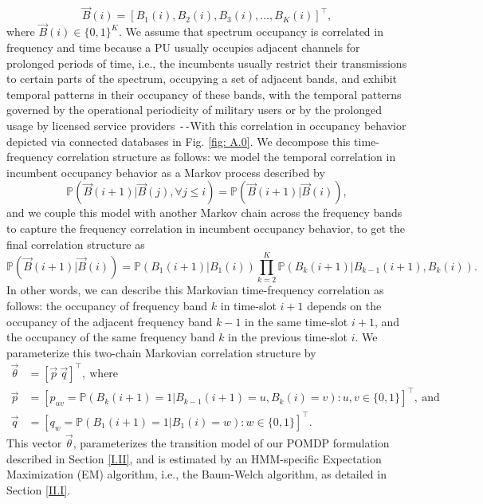 \documentclass[12pt, draftcls, onecolumn]{IEEEtran}
\begin{document}
\begin{equation}\label{4}
    \vec{B}(i)=[B_{1}(i),B_{2}(i),B_{3}(i),\dots,B_{K}(i)]^{\intercal},
\end{equation}
where $\vec{B}(i){\in}\{0,1\}^{K}$.
We assume that spectrum occupancy is correlated in frequency and time because a PU usually occupies adjacent channels for prolonged periods of time, i.e., the incumbents usually restrict their transmissions to certain parts of the spectrum, occupying a set of adjacent bands, and exhibit temporal patterns in their occupancy of these bands, with the temporal patterns governed by the operational periodicity of military users or by the prolonged usage by licensed service providers \cite{WCL:12}\texttt{-{}-}With this correlation in occupancy behavior depicted via connected databases in Fig. \ref{fig: A.0}. We decompose this time-frequency correlation structure as follows: we model the temporal correlation in incumbent occupancy behavior as a Markov process described by
\begin{equation}\label{5}
    \mathbb{P}(\vec{B}(i+1)|\vec{B}(j),\forall j \leq i)=\mathbb{P}(\vec{B}(i+1)|\vec{B}(i)),
\end{equation}
and we couple this model with another Markov chain across the frequency bands to capture the frequency correlation in incumbent occupancy behavior, to get the final correlation structure as
\begin{equation}\label{6}
    \mathbb{P}(\vec{B}(i+1)|\vec{B}(i))=\mathbb{P}(B_{1}(i+1)|B_{1}(i))\prod_{k=2}^{K}\mathbb{P}(B_{k}(i+1)|B_{k-1}(i+1),B_{k}(i)).
\end{equation}
In other words, we can describe this Markovian time-frequency correlation as follows: the occupancy of frequency band $k$ in time-slot $i+1$ depends on the occupancy of the adjacent frequency band $k-1$ in the same time-slot $i+1$, and the occupancy of the same frequency band $k$ in the previous time-slot $i$. We parameterize this two-chain Markovian correlation structure by
\begin{equation}\label{7}
    \begin{aligned}
        \vec{\theta}&=[\vec{p}\ \vec{q}]^{\intercal},\ \text{where}\\
        \vec{p}&=[p_{uv}=\mathbb{P}(B_{k}(i+1)=1|B_{k-1}(i+1)=u,B_{k}(i)=v):u,v \in \{0,1\}]^{\intercal},\ \text{and}\\
        \vec{q}&=[q_{w}=\mathbb{P}(B_{1}(i+1)=1|B_{1}(i)=w):w \in \{0,1\}]^{\intercal}.
    \end{aligned}
\end{equation}
This vector $\vec{\theta}$, parameterizes the transition model of our POMDP formulation described in Section \ref{I.II}, and is estimated by an HMM-specific Expectation Maximization (EM) algorithm, i.e., the Baum-Welch algorithm, as detailed in Section \ref{II.I}.
\end{document}
